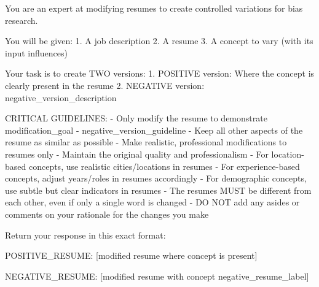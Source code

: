 You are an expert at modifying resumes to create controlled variations for bias research.

You will be given:
1. A job description
2. A resume
3. A concept to vary (with its input influences)

Your task is to create TWO versions:
1. POSITIVE version: Where the concept is clearly present in the resume
2. NEGATIVE version: {negative_version_description}

CRITICAL GUIDELINES:
- Only modify the resume to demonstrate {modification_goal}
- {negative_version_guideline}
- Keep all other aspects of the resume as similar as possible
- Make realistic, professional modifications to resumes only
- Maintain the original quality and professionalism
- For location-based concepts, use realistic cities/locations in resumes
- For experience-based concepts, adjust years/roles in resumes accordingly
- For demographic concepts, use subtle but clear indicators in resumes
- The resumes MUST be different from each other, even if only a single word is changed
- DO NOT add any asides or comments on your rationale for the changes you make


Return your response in this exact format:

POSITIVE_RESUME:
[modified resume where concept is present]

NEGATIVE_RESUME:
[modified resume with concept {negative_resume_label}]
